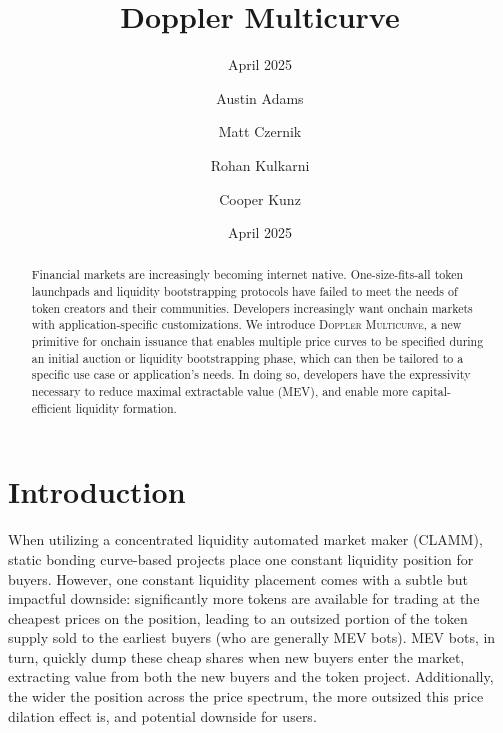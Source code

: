 \documentclass[sigconf,nonacm,prologue,table]{acmart}
\numberwithin{equation}{section}
\theoremstyle{definition}
\theoremstyle{remark}
\begin{document}
\title{Doppler Multicurve}
\subtitle{April 2025}
\date{April 2025}

\author{Austin Adams}
\affiliation{}

\author{Matt Czernik}
\affiliation{}

\author{Rohan Kulkarni}
\affiliation{}

\author{Cooper Kunz}
\affiliation{}

\begin{teaserfigure}
\caption*{
    \hspace{\textwidth}
    }
\end{teaserfigure}

\renewcommand{\shortauthors}{Adams et all}

\begin{abstract}
Financial markets are increasingly becoming internet native. One-size-fits-all token launchpads and liquidity bootstrapping protocols have failed to meet the needs of token creators and their communities. Developers increasingly want onchain markets with application-specific customizations. We introduce \textsc{Doppler Multicurve}, a new primitive for onchain issuance that enables multiple price curves to be specified during an initial auction or liquidity bootstrapping phase, which can then be tailored to a specific use case or application's needs. In doing so, developers have the expressivity necessary to reduce maximal extractable value (MEV), and enable more capital-efficient liquidity formation.
\end{abstract}

\maketitle

\section{Introduction} \label{sec:introduction}
When utilizing a concentrated liquidity automated market maker (CLAMM), static bonding curve-based projects place one constant liquidity position for buyers. However, one constant liquidity placement comes with a subtle but impactful downside: significantly more tokens are available for trading at the cheapest prices on the position, leading to an outsized portion of the token supply sold to the earliest buyers (who are generally MEV bots). MEV bots, in turn, quickly dump these cheap shares when new buyers enter the market, extracting value from both the new buyers and the token project. Additionally, the wider the position across the price spectrum, the more outsized this price dilation effect is, and potential downside for users.
\end{document}
